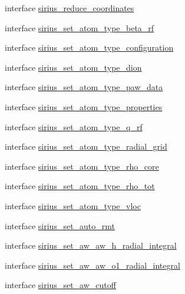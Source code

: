 \begin{DoxyCompactItemize}
\item 
interface \hyperlink{interfacesirius_1_1sirius__reduce__coordinates}{sirius\+\_\+reduce\+\_\+coordinates}
\item 
interface \hyperlink{interfacesirius_1_1sirius__set__atom__type__beta__rf}{sirius\+\_\+set\+\_\+atom\+\_\+type\+\_\+beta\+\_\+rf}
\item 
interface \hyperlink{interfacesirius_1_1sirius__set__atom__type__configuration}{sirius\+\_\+set\+\_\+atom\+\_\+type\+\_\+configuration}
\item 
interface \hyperlink{interfacesirius_1_1sirius__set__atom__type__dion}{sirius\+\_\+set\+\_\+atom\+\_\+type\+\_\+dion}
\item 
interface \hyperlink{interfacesirius_1_1sirius__set__atom__type__paw__data}{sirius\+\_\+set\+\_\+atom\+\_\+type\+\_\+paw\+\_\+data}
\item 
interface \hyperlink{interfacesirius_1_1sirius__set__atom__type__properties}{sirius\+\_\+set\+\_\+atom\+\_\+type\+\_\+properties}
\item 
interface \hyperlink{interfacesirius_1_1sirius__set__atom__type__q__rf}{sirius\+\_\+set\+\_\+atom\+\_\+type\+\_\+q\+\_\+rf}
\item 
interface \hyperlink{interfacesirius_1_1sirius__set__atom__type__radial__grid}{sirius\+\_\+set\+\_\+atom\+\_\+type\+\_\+radial\+\_\+grid}
\item 
interface \hyperlink{interfacesirius_1_1sirius__set__atom__type__rho__core}{sirius\+\_\+set\+\_\+atom\+\_\+type\+\_\+rho\+\_\+core}
\item 
interface \hyperlink{interfacesirius_1_1sirius__set__atom__type__rho__tot}{sirius\+\_\+set\+\_\+atom\+\_\+type\+\_\+rho\+\_\+tot}
\item 
interface \hyperlink{interfacesirius_1_1sirius__set__atom__type__vloc}{sirius\+\_\+set\+\_\+atom\+\_\+type\+\_\+vloc}
\item 
interface \hyperlink{interfacesirius_1_1sirius__set__auto__rmt}{sirius\+\_\+set\+\_\+auto\+\_\+rmt}
\item 
interface \hyperlink{interfacesirius_1_1sirius__set__aw__aw__h__radial__integral}{sirius\+\_\+set\+\_\+aw\+\_\+aw\+\_\+h\+\_\+radial\+\_\+integral}
\item 
interface \hyperlink{interfacesirius_1_1sirius__set__aw__aw__o1__radial__integral}{sirius\+\_\+set\+\_\+aw\+\_\+aw\+\_\+o1\+\_\+radial\+\_\+integral}
\item 
interface \hyperlink{interfacesirius_1_1sirius__set__aw__cutoff}{sirius\+\_\+set\+\_\+aw\+\_\+cutoff}
\item 

\end{DoxyCompactItemize}
